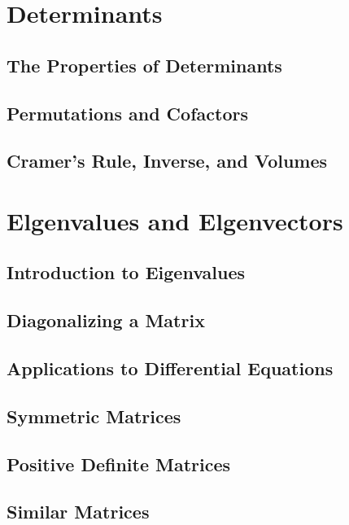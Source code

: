 \documentclass{book}
\begin{document}
\chapter{Determinants}
\section{The Properties of Determinants}

\section{Permutations and Cofactors}

\section{Cramer's Rule, Inverse, and Volumes}








\chapter{Elgenvalues and Elgenvectors}
\section{Introduction to Eigenvalues}

\section{Diagonalizing a Matrix}

\section{Applications to Differential Equations}

\section{Symmetric Matrices}

\section{Positive Definite Matrices}

\section{Similar Matrices}
\end{document}
